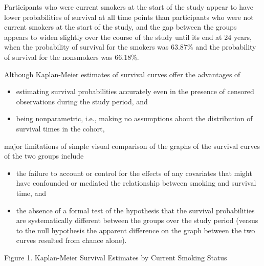 \documentclass{article}\usepackage[]{graphicx}\usepackage[]{color}
\newif\ifdraft  %
\begin{document}
\ifdraft

Using the Kaplan-Meier plots, graphically assess the relationship between baseline smoking status and time to death. \textbf{Briefly interpret what you see.} In 1-2 sentences describe the limitations of this approach. [{\ul{include the graph}}, labeled \textbf{Figure 1}] \textbf{(10 points)}

\fi



Participants who were current smokers at the start of the study appear to have lower probabilities of survival at all time points than participants who were not current smokers at the start of the study, and the gap between the groups appears to widen slightly over the course of the study until its end at 24 years, when the probability of survival for the smokers was 63.87\% and the probability of survival for the nonsmokers was 66.18\%.

\vspace{2mm}

Although Kaplan-Meier estimates of survival curves offer the advantages of 
\begin{itemize}
  \item estimating survival probabilities accurately even in the presence of censored observations during the study period, and
  \item being nonparametric, i.e., making no assumptions about the distribution of survival times in the cohort,
\end{itemize}

major limitations of simple visual comparison of the graphs of the survival curves of the two groups include 

\begin{itemize}
  \item the failure to account or control for the effects of any covariates that might have confounded or mediated the relationship between smoking and survival time, and
  \item the absence of a formal test of the hypothesis that the survival probabilities are systematically different between the groups over the study period (versus to the null hypothesis the apparent difference on the graph between the two curves resulted from chance alone).
  
\end{itemize}

Figure 1. Kaplan-Meier Survival Estimates by Current Smoking Status
\end{document}
